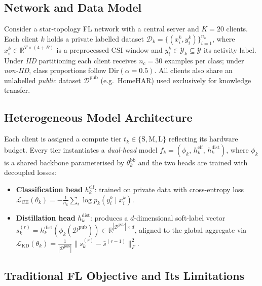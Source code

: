 \documentclass[conference]{IEEEtran}
\begin{document}
\subsection{Network and Data Model}

Consider a star-topology FL network with a central server and
$K{=}20$ clients.  Each client $k$ holds a private labelled dataset
$\mathcal{D}_k = \{(x_i^k, y_i^k)\}_{i=1}^{n_k}$,
where $x_i^k \in \mathbb{R}^{T \times (4+B)}$ is a preprocessed CSI window
and $y_i^k \in \mathcal{Y}_k \subseteq \mathcal{Y}$ its activity label.
Under \emph{IID} partitioning each client receives $n_c{=}30$ examples per
class; under \emph{non-IID}, class proportions follow
$\mathrm{Dir}(\alpha{=}0.5)$.  All clients also share an unlabelled
\emph{public} dataset $\mathcal{D}^{\text{pub}}$ (e.g.\ HomeHAR) used
exclusively for knowledge transfer.

\subsection{Heterogeneous Model Architecture}

Each client is assigned a compute tier
$t_k \in \{\text{S}, \text{M}, \text{L}\}$ reflecting its hardware budget.
Every tier instantiates a \emph{dual-head} model
$f_k = (\phi_k,\, h_k^{\text{clf}},\, h_k^{\text{dist}})$,
where $\phi_k$ is a shared backbone parameterised by
$\theta_k^{\text{bb}}$ and the two heads are trained with decoupled losses:

\begin{itemize}
  \item \textbf{Classification head} $h_k^{\text{clf}}$: trained on private
    data with cross-entropy loss
    $\mathcal{L}_{\text{CE}}(\theta_k) =
     -\frac{1}{n_k}\sum_{i} \log p_k(y_i^k \mid x_i^k)$.
  \item \textbf{Distillation head} $h_k^{\text{dist}}$: produces a
    $d$-dimensional soft-label vector
    $s_k^{(r)} = h_k^{\text{dist}}(\phi_k(\mathcal{D}^{\text{pub}}))
     \in \mathbb{R}^{|\mathcal{D}^{\text{pub}}| \times d}$,
    aligned to the global aggregate via
    $\mathcal{L}_{\text{KD}}(\theta_k) =
     \frac{1}{|\mathcal{D}^{\text{pub}}|}
     \|s_k^{(r)} - \bar{s}^{(r-1)}\|_F^2$.
\end{itemize}

\subsection{Traditional FL Objective and Its Limitations}
\end{document}
